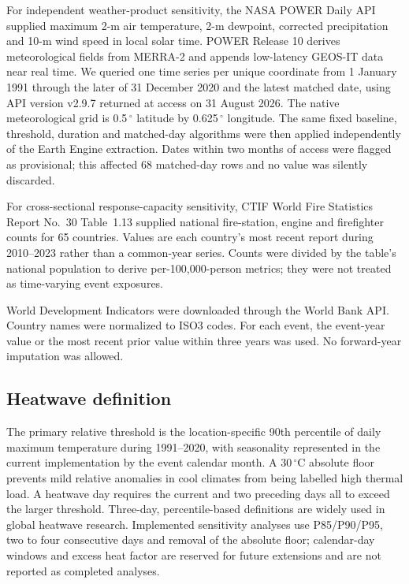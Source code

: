 \documentclass[11pt]{article}
\begin{document}
For independent weather-product sensitivity, the NASA POWER Daily API supplied maximum 2-m air temperature, 2-m dewpoint, corrected precipitation and 10-m wind speed in local solar time\citep{Gelaro2017,NASAPOWER2026}. POWER Release 10 derives meteorological fields from MERRA-2 and appends low-latency GEOS-IT data near real time. We queried one time series per unique coordinate from 1 January 1991 through the later of 31 December 2020 and the latest matched date, using API version v2.9.7 returned at access on 31 August 2026. The native meteorological grid is 0.5\,$^\circ$ latitude by 0.625\,$^\circ$ longitude. The same fixed baseline, threshold, duration and matched-day algorithms were then applied independently of the Earth Engine extraction. Dates within two months of access were flagged as provisional; this affected 68 matched-day rows and no value was silently discarded.

For cross-sectional response-capacity sensitivity, CTIF World Fire Statistics Report No.~30 Table~1.13 supplied national fire-station, engine and firefighter counts for 65 countries\citep{CTIF2025}. Values are each country's most recent report during 2010--2023 rather than a common-year series. Counts were divided by the table's national population to derive per-100,000-person metrics; they were not treated as time-varying event exposures.

World Development Indicators were downloaded through the World Bank API\citep{WorldBank2026}. Country names were normalized to ISO3 codes. For each event, the event-year value or the most recent prior value within three years was used. No forward-year imputation was allowed.

\subsection*{Heatwave definition}
The primary relative threshold is the location-specific 90th percentile of daily maximum temperature during 1991--2020, with seasonality represented in the current implementation by the event calendar month. A 30\,$^\circ$C absolute floor prevents mild relative anomalies in cool climates from being labelled high thermal load. A heatwave day requires the current and two preceding days all to exceed the larger threshold. Three-day, percentile-based definitions are widely used in global heatwave research\citep{PerkinsKirkpatrick2020}. Implemented sensitivity analyses use P85/P90/P95, two to four consecutive days and removal of the absolute floor; calendar-day windows and excess heat factor are reserved for future extensions and are not reported as completed analyses.
\end{document}
